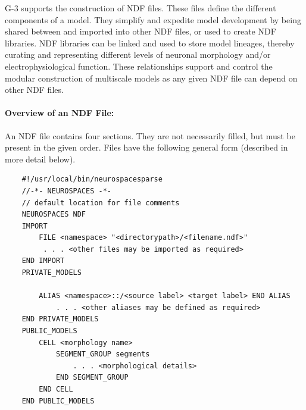 \documentclass[11pt,3p,twocolumn]{JMN}
\begin{document}
G-3 supports the construction of NDF files. These files define the different components of a model.  They simplify and expedite model development by being shared between and imported into other NDF files, or used to create NDF libraries. NDF libraries can be linked and used to store model lineages, thereby curating and representing different levels of neuronal morphology and/or electrophysiological function.
These relationships support and control the modular construction of multiscale
models as any given NDF file can depend on other NDF files.

\paragraph{Overview of an NDF File:}
\label{sec:overview-ndf-file}
An NDF file contains four sections. They are not necessarily filled, but must be present in the given order.  Files have the following general form (described in more detail below).

\begin{center}
 \begin{tiny}
\begin{verbatim}
    #!/usr/local/bin/neurospacesparse
    //-*- NEUROSPACES -*-
    // default location for file comments
    NEUROSPACES NDF
    IMPORT
        FILE <namespace> "<directorypath>/<filename.ndf>"
         . . . <other files may be imported as required>
    END IMPORT
    PRIVATE_MODELS
    
        ALIAS <namespace>::/<source label> <target label> END ALIAS
            . . . <other aliases may be defined as required>
    END PRIVATE_MODELS
    PUBLIC_MODELS
        CELL <morphology name>
            SEGMENT_GROUP segments
                . . . <morphological details>
            END SEGMENT_GROUP
        END CELL
    END PUBLIC_MODELS
\end{verbatim}
\end{tiny}
\end{center}
\end{document}
